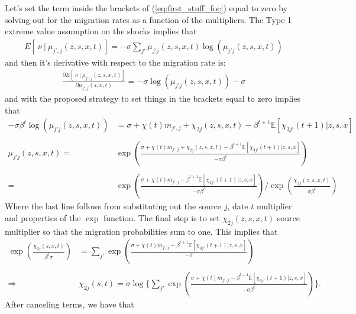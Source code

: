 \documentclass[12pt,pdftex]{article}
\begin{document}
\begin{onehalfspacing}
Let's set the term inside the brackets of (\ref{eq:first_stuff_foc}) equal to zero by solving out for the migration rates as a function of the multipliers. The Type 1 extreme value assumption on the shocks implies that
\begin{align}
E[\ \nu \ | \ \mu_{j',j}(z,s,x,t)] = -\sigma \sum_{j'}\mu_{j'j}(z,s,x,t) \log \left(\mu_{j'j}(z,s,x,t)\right)
\end{align}
and then it's derivative with respect to the migration rate is:
\begin{align}
\frac{\partial E[\ \nu \ | \ \mu_{j',j}(z,s,x,t)]}{\partial \mu_{j',j}(s,x,t)} = -\sigma \log \left(\mu_{j'j}(z,s,x,t)\right) - \sigma
\end{align}
and with the proposed strategy to set things in the brackets equal to zero implies that
{\small
\begin{align}
-\sigma \beta^{t} \log \left(\mu_{j'j}(z,s,x,t)\right) & =  \sigma + \chi(t) m_{j',j} + \chi_{2j}(z,s,x,t) - \beta^{t+1}\mathbb{E}\left[\chi_{3j'}(t+1)| z, s, x \right]\\
\nonumber \\
\mu_{j'j}(z,s,x,t) = &\exp \left( \frac{\sigma + \chi(t) m_{j',j} + \chi_{2j}(z,s,x,t) - \beta^{t+1}\mathbb{E}\left[\chi_{3j'}(t+1)|z, s,x \right]}{-\sigma \beta^{t} } \right) \\
\nonumber \\
= &\exp \left( \frac{\sigma + \chi(t) m_{j',j} - \beta^{t+1}\mathbb{E}\left[\chi_{3j'}(t+1)|z, s, x \right]}{-\sigma \beta^{t}} \right) \Bigg / \exp \left(\frac{\chi_{2j}(z,s,x,t)}{\sigma \beta^{t} } \right)
\end{align}}
Where the last line follows from substituting out the source $j$, date $t$ multiplier and properties of the $\exp$ function. The final step is to set $\chi_{2j}(z,s,x,t)$ source multiplier so that the migration probabilities sum to one. This implies that
{\small
\begin{align}
\exp \left(\frac{\chi_{2j}(s,x,t)}{\beta^{t} \sigma} \right) & = \sum_{j'} \exp \left( \frac{\sigma + \chi(t) m_{j',j} - \beta^{t+1}\mathbb{E}\left[\chi_{3j'}(t+1) | z, s, x \right]}{-\sigma  } \right) \\
\nonumber \\
\Rightarrow \ \ \ & \chi_{2j}(s,t) = \sigma \log  \Bigg \{  \sum_{j'} \exp \left( \frac{\sigma + \chi(t) m_{j',j} - \beta^{t+1}\mathbb{E}\left[\chi_{3j'}(t+1)| z, s, x \right]}{-\sigma \beta^{t} } \right) \Bigg \}.
\end{align}}
After canceling terms, we have that

\end{onehalfspacing}
\end{document}
